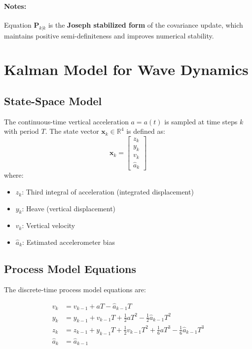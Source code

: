 \documentclass[11pt,letterpaper]{article}
\begin{document}
\paragraph{Notes:}
Equation \( {\mathbf{P}}_{k|k} \) is the \textbf{Joseph stabilized form} of the covariance update, which maintains positive semi-definiteness and improves numerical stability.



\section{Kalman Model for Wave Dynamics}

\subsection*{State-Space Model}
The continuous-time vertical acceleration \( a = a(t) \) is sampled at time steps \( k \) with period \( T \). The state vector \( \mathbf{x}_k \in \mathbb{R}^4 \) is defined as:
\begin{equation}
\mathbf{x}_k = \begin{bmatrix}
z_k \\
y_k \\
v_k \\
\hat{a}_k
\end{bmatrix}
\end{equation}
where:
\begin{itemize}
  \item \( z_k \): Third integral of acceleration (integrated displacement)
  \item \( y_k \): Heave (vertical displacement)
  \item \( v_k \): Vertical velocity
  \item \( \hat{a}_k \): Estimated accelerometer bias
\end{itemize}


\subsection*{Process Model Equations}
The discrete-time process model equations are:

\begin{align}
v_k &= v_{k-1} + a T - \hat{a}_{k-1} T \\
y_k &= y_{k-1} + v_{k-1} T + \frac{1}{2}a T^2 - \frac{1}{2}\hat{a}_{k-1} T^2 \\
z_k &= z_{k-1} + y_{k-1} T + \frac{1}{2}v_{k-1} T^2 + \frac{1}{6}a T^3 - \frac{1}{6}\hat{a}_{k-1} T^3 \\
\hat{a}_k &= \hat{a}_{k-1}
\end{align}
\end{document}
